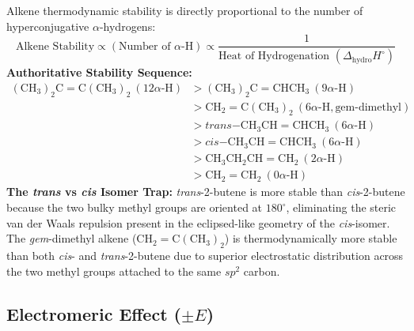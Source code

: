 \documentclass[10pt,a4paper]{article}
\begin{document}
\begin{formulabox}
Alkene thermodynamic stability is directly proportional to the number of hyperconjugative $\alpha$-hydrogens:
\begin{equation}
  \text{Alkene Stability} \propto (\text{Number of } \alpha\text{-H}) \propto \frac{1}{\text{Heat of Hydrogenation } (\Delta_{\mathrm{hydro}}H^\circ)}
\end{equation}
\textbf{Authoritative Stability Sequence:}
\begin{equation}
  \begin{aligned}
    \mathrm{(CH_3)_2C=C(CH_3)_2} \ (12\alpha\text{-H}) &> \mathrm{(CH_3)_2C=CHCH_3} \ (9\alpha\text{-H}) \\
    &> \mathrm{CH_2=C(CH_3)_2} \ (6\alpha\text{-H}, \text{gem-dimethyl}) \\
    &> \textit{trans}\mathrm{-CH_3CH=CHCH_3} \ (6\alpha\text{-H}) \\
    &> \textit{cis}\mathrm{-CH_3CH=CHCH_3} \ (6\alpha\text{-H}) \\
    &> \mathrm{CH_3CH_2CH=CH_2} \ (2\alpha\text{-H}) \\
    &> \mathrm{CH_2=CH_2} \ (0\alpha\text{-H})
  \end{aligned}
\end{equation}
\textbf{The \textit{trans} vs \textit{cis} Isomer Trap:} \textit{trans}-2-butene is more stable than \textit{cis}-2-butene because the two bulky methyl groups are oriented at $180^\circ$, eliminating the steric van der Waals repulsion present in the eclipsed-like geometry of the \textit{cis}-isomer. The \textit{gem}-dimethyl alkene ($\mathrm{CH_2=C(CH_3)_2}$) is thermodynamically more stable than both \textit{cis}- and \textit{trans}-2-butene due to superior electrostatic distribution across the two methyl groups attached to the same $sp^2$ carbon.
\end{formulabox}

\subsection{Electromeric Effect (\texorpdfstring{$\pm E$}{+-E})}
\end{document}
